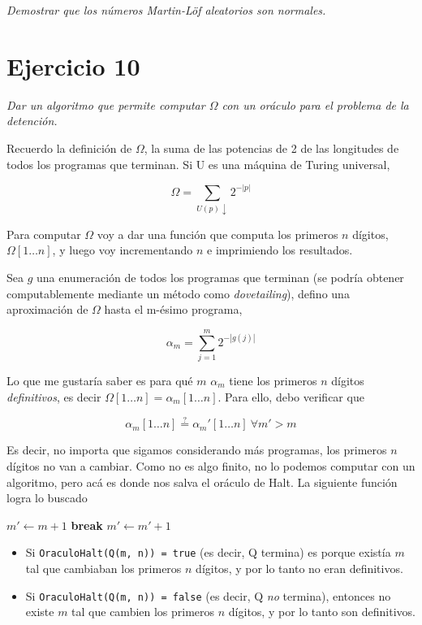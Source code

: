 \documentclass{article}
\theoremstyle{definition} %
\newcommand{\progends}{\downarrow}
\newcommand{\firstn}[1]{\first{n}{#1}}
\newcommand{\first}[2]{#2[1 \dots #1]}
\begin{document}
\textit{Demostrar que los números Martin-Löf aleatorios son normales.}

\section*{Ejercicio 10}

\textit{Dar un algoritmo que permite computar $\Omega$ con un oráculo para el problema de la detención.}

Recuerdo la definición de $\Omega$, la suma de las potencias de 2 de las
longitudes de todos los programas que terminan. Si U es una máquina de Turing
universal,

\[
    \Omega = \sum_{U(p)\progends} 2 ^ {-|p|}
\]

Para computar $\Omega$ voy a dar una función que computa los primeros $n$
dígitos, $\firstn{\Omega}$, y luego voy incrementando $n$ e imprimiendo los
resultados.

Sea $g$ una enumeración de todos los programas que terminan (se
podría obtener computablemente mediante un método como \textit{dovetailing}),
defino una aproximación de $\Omega$ hasta el m-ésimo programa,

\[
    \alpha_m = \sum_{j = 1}^{m} 2 ^ {-|g(j)|}
\]

Lo que me gustaría saber es para qué $m$ $\alpha_m$ tiene los primeros $n$
dígitos \textit{definitivos}, es decir $\firstn{\Omega} = \firstn{\alpha_m}$.
Para ello, debo verificar que

\[
    \firstn{\alpha_m} \overset{?}{=} \firstn{\alpha_m'}\ \forall m' > m
\]

Es decir, no importa que sigamos considerando más programas, los primeros $n$
dígitos no van a cambiar. Como no es algo finito, no lo podemos computar con un
algoritmo, pero acá es donde nos salva el oráculo de Halt. La siguiente función
logra lo buscado

\begin{algorithmic}
        \State $m' \gets m + 1$
            \If{$\firstn{\alpha_m} \neq \firstn{\alpha_m'}$}
            \State \textbf{break}
            \EndIf
            \State $m' \gets m' + 1$
        \EndWhile
    \EndFunction
\end{algorithmic}

\begin{itemize}
    \item Si \texttt{OraculoHalt(Q(m, n)) = true} (es decir, Q termina) es
    porque existía $m$ tal que cambiaban los primeros $n$ dígitos, y por lo
    tanto no eran definitivos.

    \item Si \texttt{OraculoHalt(Q(m, n)) = false} (es decir, Q \textit{no}
    termina), entonces no existe $m$ tal que cambien los primeros $n$ dígitos, y
    por lo tanto son definitivos.
\end{itemize}
\end{document}
